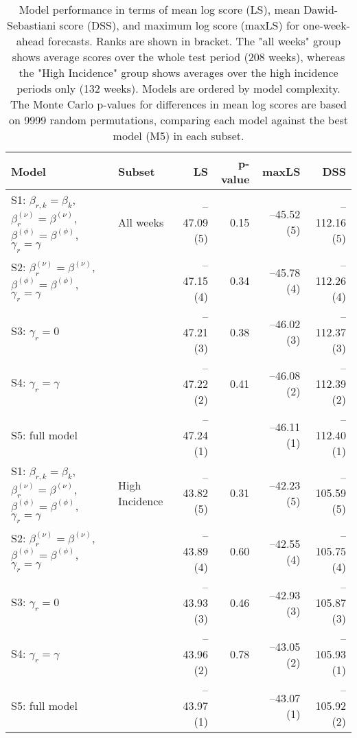 \begin{table}[ht]
\centering
\begingroup\fontsize{9pt}{10pt}\selectfont
\begin{tabular}{ll|rrrr}
  \hline
Model & Subset & LS & p-value & maxLS & DSS \\ 
  \hline
S1: $\beta_{r,k} = \beta_{k}$, $\beta_{r}^{(\nu)} = \beta^{(\nu)}$, $\beta^{(\phi)} = \beta^{(\phi)}$, $\gamma_r = \gamma$ & All weeks & --47.09 (5) & 0.15 & --45.52 (5) & --112.16 (5) \\ 
  S2: $\beta_{r}^{(\nu)} = \beta^{(\nu)}$, $\beta^{(\phi)} = \beta^{(\phi)}$, $\gamma_r = \gamma$ &  & --47.15 (4) & 0.34 & --45.78 (4) & --112.26 (4) \\ 
  S3: $\gamma_r = 0$ &  & --47.21 (3) & 0.38 & --46.02 (3) & --112.37 (3) \\ 
  S4: $\gamma_r = \gamma$ &  & --47.22 (2) & 0.41 & --46.08 (2) & --112.39 (2) \\ 
  S5: full model &  & --47.24 (1) &  & --46.11 (1) & --112.40 (1) \\ 
   \hline
S1: $\beta_{r,k} = \beta_{k}$, $\beta_{r}^{(\nu)} = \beta^{(\nu)}$, $\beta^{(\phi)} = \beta^{(\phi)}$, $\gamma_r = \gamma$ & High Incidence & --43.82 (5) & 0.31 & --42.23 (5) & --105.59 (5) \\ 
  S2: $\beta_{r}^{(\nu)} = \beta^{(\nu)}$, $\beta^{(\phi)} = \beta^{(\phi)}$, $\gamma_r = \gamma$ &  & --43.89 (4) & 0.60 & --42.55 (4) & --105.75 (4) \\ 
  S3: $\gamma_r = 0$ &  & --43.93 (3) & 0.46 & --42.93 (3) & --105.87 (3) \\ 
  S4: $\gamma_r = \gamma$ &  & --43.96 (2) & 0.78 & --43.05 (2) & --105.93 (1) \\ 
  S5: full model &  & --43.97 (1) &  & --43.07 (1) & --105.92 (2) \\ 
   \hline
\end{tabular}
\endgroup
\caption{Model performance in terms of mean log score (LS),
             mean Dawid-Sebastiani score (DSS), and maximum log score (maxLS)
             for one-week-ahead forecasts.
             Ranks are shown in bracket.
             The "all weeks" group shows average scores over the
             whole test period (208 weeks),
             whereas the "High Incidence" group shows
             averages over the high incidence periods only (132 weeks).
             Models are ordered by model complexity.
             The Monte Carlo p-values for differences in mean log scores
             are based on 9999 random permutations,
             comparing each model against the best model (M5) in each subset.} 
\label{tab:forecast}
\end{table}
